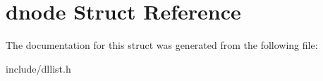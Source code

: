 \hypertarget{structdnode}{\section{dnode Struct Reference}
\label{structdnode}
}


The documentation for this struct was generated from the following file\-:\begin{DoxyCompactItemize}
\item 
include/dllist.\-h\end{DoxyCompactItemize}

